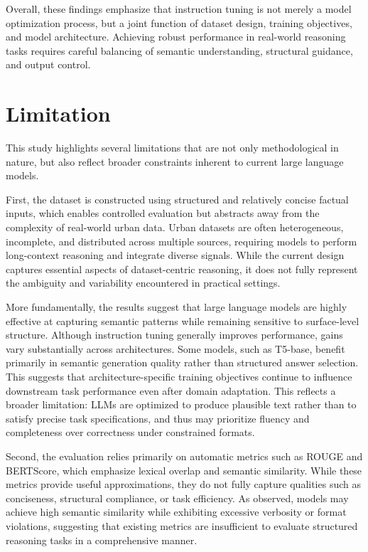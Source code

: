 \documentclass[a4paper,fleqn]{cas-sc}
\begin{document}
Overall, these findings emphasize that instruction tuning is not merely a model optimization process, but a joint function of dataset design, training objectives, and model architecture. Achieving robust performance in real-world reasoning tasks requires careful balancing of semantic understanding, structural guidance, and output control.

\section{Limitation}

This study highlights several limitations that are not only methodological in nature, but also reflect broader constraints inherent to current large language models.

First, the dataset is constructed using structured and relatively concise factual inputs, which enables controlled evaluation but abstracts away from the complexity of real-world urban data. Urban datasets are often heterogeneous, incomplete, and distributed across multiple sources, requiring models to perform long-context reasoning and integrate diverse signals. While the current design captures essential aspects of dataset-centric reasoning, it does not fully represent the ambiguity and variability encountered in practical settings.

More fundamentally, the results suggest that large language models are highly effective at capturing semantic patterns while remaining sensitive to surface-level structure. Although instruction tuning generally improves performance, gains vary substantially across architectures. Some models, such as T5-base, benefit primarily in semantic generation quality rather than structured answer selection. This suggests that architecture-specific training objectives continue to influence downstream task performance even after domain adaptation. This reflects a broader limitation: LLMs are optimized to produce plausible text rather than to satisfy precise task specifications, and thus may prioritize fluency and completeness over correctness under constrained formats.

Second, the evaluation relies primarily on automatic metrics such as ROUGE and BERTScore, which emphasize lexical overlap and semantic similarity. While these metrics provide useful approximations, they do not fully capture qualities such as conciseness, structural compliance, or task efficiency. As observed, models may achieve high semantic similarity while exhibiting excessive verbosity or format violations, suggesting that existing metrics are insufficient to evaluate structured reasoning tasks in a comprehensive manner.
\end{document}
